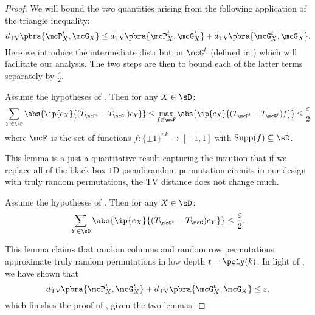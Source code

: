 \begin{proof}
We will bound the two quantities arising from the following application of the triangle inequality:
\begin{equation*}
    d_{\textrm{TV}}\pbra{\mcP^t_X, \mcG_X} \leq d_{\textrm{TV}}\pbra{\mcP^t_X, \mcG^t_X} + d_{\textrm{TV}}\pbra{\mcG^t_X, \mcG_X}.
\end{equation*}
Here we introduce the intermediate distribution $\mcG^t$ (defined in ) which will facilitate our analysis. The two steps are then to bound each of the latter terms separately by $\frac{\varepsilon}{2}$.

\begin{lemma}
    \label{lem:reduction}
    Assume the hypotheses of . Then for any $X \in \sD$:
\begin{equation*}
    \sum_{Y \in \sD} \abs{\ip{e_X}{(T_{\mcP^t}-T_{\mcG^t}) e_Y}} \leq  \max_{f \in \mcF} \abs{\ip{e_X}{(T_{\mcP^t}-T_{\mcG^t}) f}} \leq \frac\varepsilon2
\end{equation*}
where $\mcF$ is the set of functions $f : \{\pm1\}^{nk} \to [-1, 1]$ with $\mathrm{Supp}(f) \subseteq \sD$.
\end{lemma}

This lemma is a just a quantitative result capturing the intuition that if we replace all of the black-box $1$D pseudorandom permutation circuits in our design with truly random permutations, the TV distance does not change much.

\begin{lemma}
    \label{lem:maintrick}
    Assume the hypotheses of . Then for any $X \in \sD$:
\begin{equation*}
    \sum_{Y \in \sD} \abs{\ip{e_X}{(T_{\mcG^t}-T_{\mcG}) e_Y}} \leq \frac\varepsilon2.
\end{equation*}
\end{lemma}

This lemma claims that random columns and random row permutations approximate truly random permutations in low depth $t = \poly(k)$. In light of , we have shown that
\begin{equation*}
    d_{\textrm{TV}}\pbra{\mcP^t_X, \mcG^t_X} + d_{\textrm{TV}}\pbra{\mcG^t_X, \mcG_X} \leq \varepsilon,
\end{equation*}
which finishes the proof of , given the two lemmas.
\end{proof}


